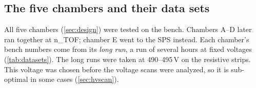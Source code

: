 \subsection{The five chambers and their data sets}\label{sec:datasets}
All five chambers (\cref{sec:design}) were tested on the bench. Chambers A--D later ran together at n\_TOF; chamber E
went to the SPS instead. Each chamber's bench numbers come from its \emph{long run}, a run of several hours at fixed
voltages (\cref{tab:datasets}). The long runs were taken at 490--495\,V on the resistive strips. This voltage was chosen before the voltage
scans were analyzed, so it is sub-optimal in some cases (\cref{sec:hvscan}).


